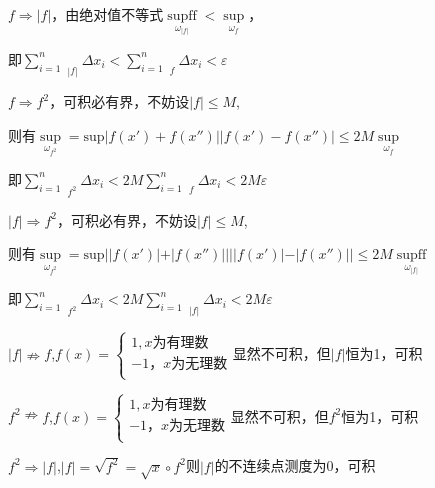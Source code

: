 \documentclass[lang=cn,10pt]{elegantbook}
\begin{document}
\begin{solution}
	
	$f\Rightarrow |f|$，由绝对值不等式$\mathop {\mathrm{sup}||f\left( x\prime \right) |-|f\left( x'' \right) ||} \limits_{\omega _{|f|}}<\mathop {\mathrm{sup}|f\left( x\prime \right) -f\left( x'' \right) |} \limits_{\omega _f}
	$，
	
	即$\sum_{i=1}^n{\mathop {\omega _i} \limits_{|f|}\varDelta x_i}<\sum_{i=1}^n{\mathop {\omega _i} \limits_{f}\varDelta x_i}<\varepsilon 
	$
	
	$f\Rightarrow f^{2}$，可积必有界，不妨设$|f|\le M$,
	
	则有$\mathop {\mathrm{sup}|f^2\left( x\prime \right) -f^2\left( x'' \right) |} \limits_{\omega _{f^2}}=\mathrm{sup}|f\left( x\prime \right) +f\left( x'' \right) ||f\left( x\prime \right) -f\left( x'' \right) |\le 2M\mathop {\mathrm{sup}|f\left( x\prime \right) -f\left( x'' \right) |} \limits_{\omega _f}
	$
	
	即$\sum_{i=1}^n{\mathop {\omega _i} \limits_{f^2}\varDelta x_i}<2M\sum_{i=1}^n{\mathop {\omega _i} \limits_{f}\varDelta x_i}<2M\varepsilon 
	$
	
	$|f|\Rightarrow f^{2}$，可积必有界，不妨设$|f|\le M$,
	
	则有$\mathop {\mathrm{sup}||f^2\left( x\prime \right) |-|f^2\left( x'' \right) ||} \limits_{\omega _{f^2}}=\mathrm{sup}||f\left( x\prime \right) |+|f\left( x'' \right) ||||f\left( x\prime \right) |-|f\left( x'' \right) ||\le 2M\mathop {\mathrm{sup}||f\left( x\prime \right) |-|f\left( x'' \right) ||} \limits_{\omega _{|f|}}
	$
	
	即$\sum_{i=1}^n{\mathop {\omega _i} \limits_{f^2}\varDelta x_i}<2M\sum_{i=1}^n{\mathop {\omega _i} \limits_{|f|}\varDelta x_i}<2M\varepsilon 
	$
	
	$|f|\nRightarrow f$,$f\left( x \right) =\begin{cases}
		1 ,x\text{为有理数}\\
		-1\text{，} x\text{为无理数}\\
	\end{cases}$显然不可积，但$|f|$恒为1，可积
	
	 $f^{2}\nRightarrow f$,$f\left( x \right) =\begin{cases}
	 	1 ,x\text{为有理数}\\
	 	-1\text{，} x\text{为无理数}\\
	 \end{cases}$显然不可积，但$f^{2}$恒为1，可积
	 
	 $f^{2}\Rightarrow |f|$,$|f|=\sqrt{f^{2}}=\sqrt{x}\circ f^2$则$|f|$的不连续点测度为0，可积
\end{solution}
\end{document}
